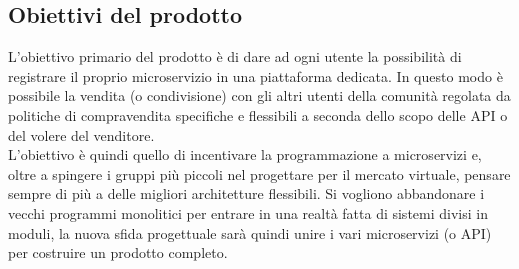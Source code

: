 \documentclass[12pt,a4paper,titlepage]{article}
\begin{document}
	\subsection{Obiettivi del prodotto}
	L'obiettivo primario del prodotto è di dare ad ogni utente la possibilità di registrare il proprio microservizio in una piattaforma dedicata. In questo modo è possibile la vendita (o condivisione) con gli altri utenti della comunità regolata da politiche di compravendita specifiche e flessibili a seconda dello scopo delle API o del volere del venditore.\\
	L'obiettivo è quindi quello di incentivare la programmazione a microservizi e, oltre a spingere i gruppi più piccoli nel progettare per il mercato virtuale, pensare sempre di più a delle migliori architetture flessibili. Si vogliono abbandonare i vecchi programmi monolitici per entrare in una realtà fatta di sistemi divisi in moduli, la nuova sfida progettuale sarà quindi unire i vari microservizi (o API) per costruire un prodotto completo.
	
\end{document}
